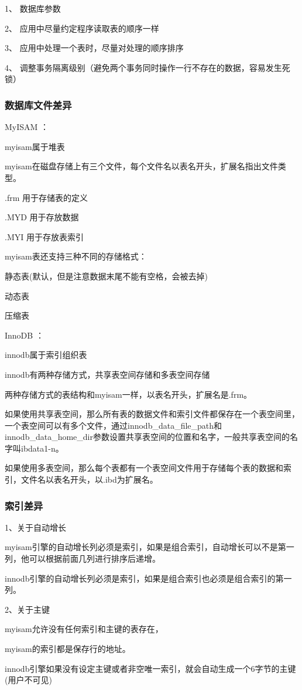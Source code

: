 \documentclass[UTF8]{ctexart}
\begin{document}
1、  数据库参数

2、  应用中尽量约定程序读取表的顺序一样

3、  应用中处理一个表时，尽量对处理的顺序排序

4、  调整事务隔离级别（避免两个事务同时操作一行不存在的数据，容易发生死锁）
\subsubsection{数据库文件差异}
MyISAM ：

myisam属于堆表

myisam在磁盘存储上有三个文件，每个文件名以表名开头，扩展名指出文件类型。

.frm 用于存储表的定义

.MYD 用于存放数据

.MYI 用于存放表索引

myisam表还支持三种不同的存储格式：

静态表(默认，但是注意数据末尾不能有空格，会被去掉)

动态表

压缩表

InnoDB ：

innodb属于索引组织表

innodb有两种存储方式，共享表空间存储和多表空间存储

两种存储方式的表结构和myisam一样，以表名开头，扩展名是.frm。

如果使用共享表空间，那么所有表的数据文件和索引文件都保存在一个表空间里，一个表空间可以有多个文件，通过innodb\_data\_file\_path和innodb\_data\_home\_dir参数设置共享表空间的位置和名字，一般共享表空间的名字叫ibdata1-n。

如果使用多表空间，那么每个表都有一个表空间文件用于存储每个表的数据和索引，文件名以表名开头，以.ibd为扩展名。

\subsubsection{索引差异}
1、关于自动增长

myisam引擎的自动增长列必须是索引，如果是组合索引，自动增长可以不是第一列，他可以根据前面几列进行排序后递增。

innodb引擎的自动增长列必须是索引，如果是组合索引也必须是组合索引的第一列。

2、关于主键

myisam允许没有任何索引和主键的表存在，

myisam的索引都是保存行的地址。

innodb引擎如果没有设定主键或者非空唯一索引，就会自动生成一个6字节的主键(用户不可见)
\end{document}
